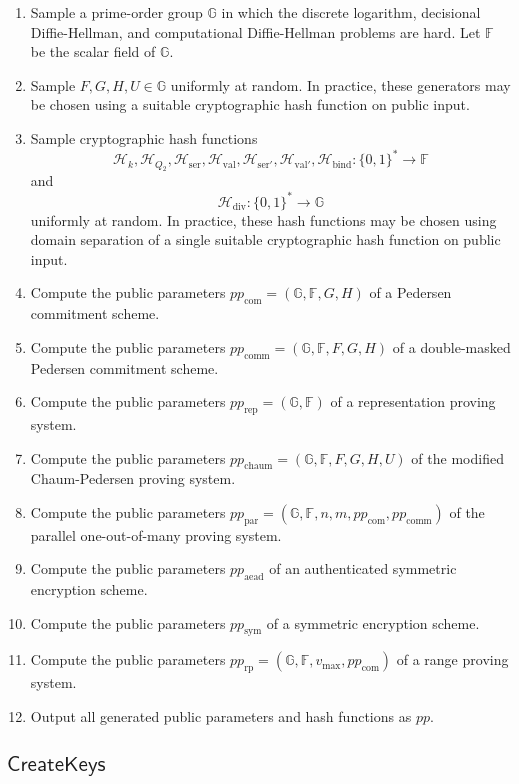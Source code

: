 \documentclass{llncs}
\newcommand{\G}{\mathbb{G}}
\newcommand{\F}{\mathbb{F}}
\newcommand{\hash}{\mathcal{H}}
\newcommand{\func}[1]{\mathsf{#1}}
\begin{document}
\begin{enumerate}
\item Sample a prime-order group $\G$ in which the discrete logarithm, decisional Diffie-Hellman, and computational Diffie-Hellman problems are hard.
Let $\F$ be the scalar field of $\G$.
\item Sample $F,G,H,U \in \G$ uniformly at random.
In practice, these generators may be chosen using a suitable cryptographic hash function on public input.
\item Sample cryptographic hash functions $$\hash_k, \hash_{Q_2},\hash_{\text{ser}},\hash_{\text{val}},\hash_{\text{ser}'},\hash_{\text{val}'},\hash_{\text{bind}}: \{0,1\}^* \to \F$$ and $$\hash_{\text{div}}: \{0,1\}^* \to \G$$ uniformly at random.
In practice, these hash functions may be chosen using domain separation of a single suitable cryptographic hash function on public input.
\item Compute the public parameters $pp_{\text{com}} = (\G,\F,G,H)$ of a Pedersen commitment scheme.
\item Compute the public parameters $pp_{\text{comm}} = (\G,\F,F,G,H)$ of a double-masked Pedersen commitment scheme.
\item Compute the public parameters $pp_{\text{rep}} = (\G,\F)$ of a representation proving system.
\item Compute the public parameters $pp_{\text{chaum}} = (\G,\F,F,G,H,U)$ of the modified Chaum-Pedersen proving system.
\item Compute the public parameters $pp_{\text{par}} = (\G,\F,n,m,pp_{\text{com}},pp_{\text{comm}})$ of the parallel one-out-of-many proving system.
\item Compute the public parameters $pp_{\text{aead}}$ of an authenticated symmetric encryption scheme.
\item Compute the public parameters $pp_{\text{sym}}$ of a symmetric encryption scheme.
\item Compute the public parameters $pp_{\text{rp}} = (\G,\F,v_{\text{max}},pp_{\text{com}})$ of a range proving system.
\item Output all generated public parameters and hash functions as $pp$.
\end{enumerate}


\subsection{\texorpdfstring{$\func{CreateKeys}$}{CreateKeys}}
\end{document}
